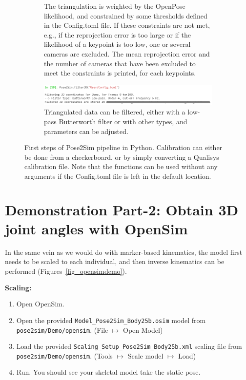 \begin{figure}[hbtp]
\begin{subfigure}[b]{1\textwidth}
            \caption{The triangulation is weighted by the OpenPose likelihood, and constrained by some thresholds defined in the Config.toml file. If these constraints are not met, e.g., if the reprojection error is too large or if the likelihood of a keypoint is too low, one or several cameras are excluded. The mean reprojection error and the number of cameras that have been excluded to meet the constraints is printed, for each keypoints.}
      \end{subfigure}
      \begin{subfigure}[b]{1\textwidth}
		\centering
		\def\svgwidth{1\columnwidth}
		\fontsize{10pt}{10pt}\selectfont
		\includegraphics[width=\linewidth]{"../Chap3/Figures/Fig_Filter3D.png"}
            \caption{Triangulated data can be filtered, either with a low-pass Butterworth filter or with other types, and parameters can be adjusted.}
      \end{subfigure}
	\caption{First steps of Pose2Sim pipeline in Python. Calibration can either be done from a checkerboard, or by simply converting a Qualisys calibration file. Note that the functions can be used without any arguments if the Config.toml file is left in the default location.}
	\label{fig_pose2sim}
\end{figure}


\FloatBarrier
\section{Demonstration Part-2: Obtain 3D joint angles with OpenSim}
In the same vein as we would do with marker-based kinematics, the model first needs to be scaled to each individual, and then inverse kinematics can be performed (Figures~\ref{fig_opensimdemo}).

\textbf{Scaling:}
\begin{enumerate}[itemsep=0em, topsep=0em, leftmargin=*]
      \item Open OpenSim.
      \item Open the provided \texttt{Model_Pose2Sim_Body25b.osim} model from \texttt{pose2sim/Demo/opensim}. (File $\mapsto$ Open Model)
      \item Load the provided \texttt{Scaling_Setup_Pose2Sim_Body25b.xml} scaling file from \\\texttt{pose2sim/Demo/opensim}. (Tools $\mapsto$ Scale model $\mapsto$ Load)
      \item Run. You should see your skeletal model take the static pose.
\end{enumerate}


